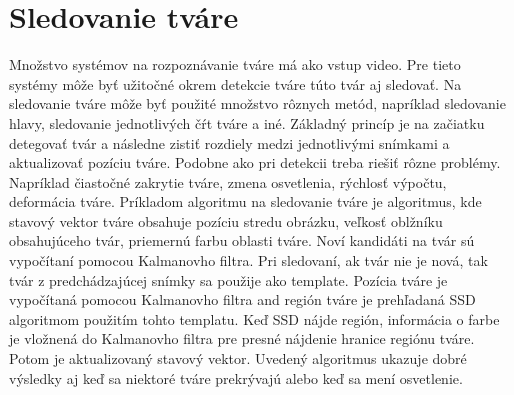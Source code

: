 \section{Sledovanie tváre}
Množstvo systémov na rozpoznávanie tváre má ako vstup video. Pre tieto systémy môže byť užitočné okrem detekcie tváre túto tvár aj sledovať.
Na sledovanie tváre môže byť použité množstvo rôznych metód, napríklad sledovanie hlavy, sledovanie jednotlivých čŕt tváre a iné.
Základný princíp je na začiatku detegovať tvár a následne zistiť rozdiely medzi jednotlivými snímkami a aktualizovať pozíciu tváre.
Podobne ako pri detekcii treba riešiť rôzne problémy. Napríklad čiastočné zakrytie tváre, zmena osvetlenia, rýchlosť výpočtu, deformácia tváre.
Príkladom algoritmu na sledovanie tváre je algoritmus, kde stavový vektor tváre obsahuje pozíciu stredu obrázku, veľkosť oblžníku obsahujúceho tvár, priemernú farbu oblasti tváre.
Noví kandidáti na tvár sú vypočítaní pomocou Kalmanovho filtra. Pri sledovaní, ak tvár nie je nová, tak tvár z predchádzajúcej snímky sa použije ako template.
Pozícia tváre je vypočítaná pomocou Kalmanovho filtra and región tváre je prehľadaná SSD algoritmom použitím tohto templatu.
Keď SSD nájde región, informácia o farbe je vložnená do Kalmanovho filtra pre presné nájdenie hranice regiónu tváre.
Potom je aktualizovaný stavový vektor.
Uvedený algoritmus ukazuje dobré výsledky aj keď sa niektoré tváre prekrývajú alebo keď sa mení osvetlenie.